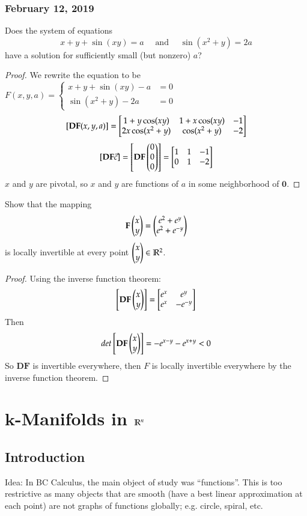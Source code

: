 \subsubsection*{February 12, 2019}

Does the system of equations
\[x+y+\sin (xy)=a\quad\text{ and }\quad \sin (x^2+y)=2a\]
have a solution for sufficiently small (but nonzero) $a$?


\begin{proof}
  We rewrite the equation to be $F(x,y,a)=\begin{cases}
    x+y+\sin(xy)-a &= 0 \\
    \sin(x^2+y)-2a &= 0
  \end{cases}$
  \[[\textbf{DF}(x,y,a)] = \begin{bmatrix} 1 + y\cos(xy) & 1 + x\cos(xy) & -1 \\ 2x\cos(x^2+y) & \cos(x^2+y) & -2 \end{bmatrix}\]
  \[[\textbf{DF}\vec{c}] = \begin{bmatrix} \textbf{DF}\begin{pmatrix} 0 \\ 0 \\ 0 \end{pmatrix} \end{bmatrix} = \begin{bmatrix} 1 & 1 & -1 \\ 0 & 1 & -2 \end{bmatrix}\]
  $x$ and $y$ are pivotal, so $x$ and $y$ are functions of $a$ in some neighborhood of $\bm{0}$.
\end{proof}

Show that the mapping
\[\textbf{F}\begin{pmatrix} x \\ y \end{pmatrix}=\begin{pmatrix} e^2+e^y \\ e^2 + e^{-y} \end{pmatrix}\]
is locally invertible at every point $\begin{pmatrix} x \\ y \end{pmatrix}\in \mathbb{R}^2$. 
\begin{proof}
	Using the inverse function theorem: 
	\[\begin{bmatrix} \textbf{DF}\begin{pmatrix} x \\ y \end{pmatrix} \end{bmatrix}=\begin{bmatrix} e^x & e^y \\ e^x & -e^{-y} \end{bmatrix}\]
	Then
	\[det\begin{bmatrix} \textbf{DF}\begin{pmatrix} x \\ y \end{pmatrix} \end{bmatrix}=-e^{x-y}-e^{x+y}<0\]
	So $\bm{DF}$ is invertible everywhere, then $F$ is locally invertible everywhere by the inverse function theorem. 
\end{proof}

\section{$\bm{k}$-Manifolds in $\mathbb{R}^n$}
\subsection{Introduction}
Idea: In BC Calculus, the main object of study was ``functions''. This is too restrictive as many objects that are smooth (have a best linear approximation at each point) are not graphs of functions globally; e.g. circle, spiral, etc.

